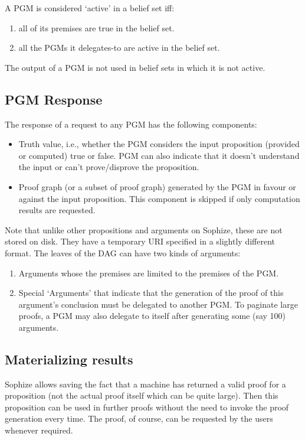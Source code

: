\documentclass[runningheads]{llncs}
\begin{document}
A PGM is considered `active' in a belief set iff:
\begin{enumerate}
\item all of its premises are true in the belief set.
\item all the PGMs it delegates-to are active in the belief set.
\end{enumerate}

The output of a PGM is not used in belief sets in which it is not active.

\subsection{PGM Response}
The response of a request to any PGM has the following components:

\begin{itemize}

\item Truth value, i.e., whether the PGM considers the input proposition (provided or computed) true or false. PGM can also indicate that it doesn't understand the input or can't prove/disprove the proposition.

\item Proof graph (or a subset of proof graph) generated by the PGM in favour or against the input proposition. This component is skipped if only computation results are requested.
\end{itemize}

Note that unlike other propositions and arguments on Sophize, these are not stored on disk. They have a temporary URI specified in a slightly different format. The leaves of the DAG can have two kinds of arguments:

\begin{enumerate}
\item Arguments whose the premises are limited to the premises of the PGM.
\item Special `Arguments' that indicate that the generation of the proof of this argument's conclusion must be delegated to another PGM. To paginate large proofs, a PGM may also delegate to itself after generating some (say 100) arguments.
\end{enumerate}
\subsection{Materializing results}

Sophize allows saving the fact that a machine has returned a valid proof for a proposition (not the actual proof itself which can be quite large). Then this proposition can be used in further proofs without the need to invoke the proof generation every time. The proof, of course, can be requested by the users whenever required.
\end{document}
